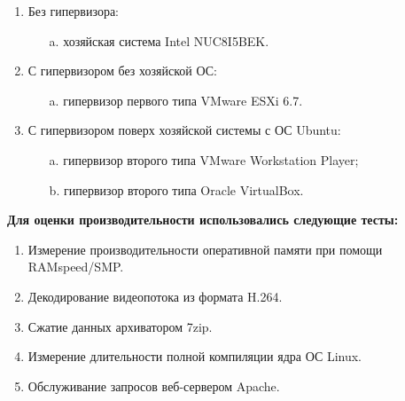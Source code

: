 \documentclass[14pt, a4paper]{article}
\begin{document}
\begin{enumerate}
    \item Без гипервизора:
    \begin{enumerate}
        \item[a.] хозяйская система Intel NUC8I5BEK. 
    \end{enumerate}
        
    \item С гипервизором без хозяйской ОС:
    \begin{enumerate}
        \item[a.] гипервизор первого типа VMware ESXi 6.7. 
    \end{enumerate}

    \item С гипервизором поверх хозяйской системы с ОС Ubuntu:
    \begin{enumerate}
        \item[a.] гипервизор второго типа VMware Workstation Player;
        \item[b.] гипервизор второго типа Oracle VirtualBox.
    \end{enumerate}
         
\end{enumerate}

\textbf{Для оценки производительности использовались следующие тесты:}
\begin{enumerate}
    \item Измерение производительности оперативной памяти при помощи \\RAMspeed/SMP.
    \item Декодирование видеопотока из формата H.264.
    \item Сжатие данных архиватором 7zip.
    \item Измерение длительности полной компиляции ядра ОС Linux.
    \item Обслуживание запросов веб-сервером Apache.
\end{enumerate}

\newpage

\begin{figure}[h]
    \centering
    \\
    \label{framework} 
\end{figure}

\begin{figure}[h]
    \centering
    \\
    \label{framework} 
\end{figure}
\end{document}
